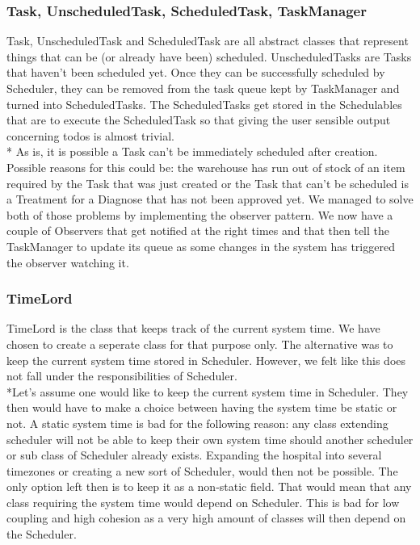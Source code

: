 \documentclass[11pt]{article}
\begin{document}
\subsubsection{Task, UnscheduledTask, ScheduledTask, TaskManager}
Task, UnscheduledTask and ScheduledTask are all abstract classes that represent things that can be (or already have been) scheduled. UnscheduledTasks are Tasks that haven't been scheduled yet. Once they can be successfully scheduled by Scheduler, they can be removed from the task queue kept by TaskManager and turned into ScheduledTasks. The ScheduledTasks get stored in the Schedulables that are to execute the ScheduledTask so that giving the user sensible output concerning todos is almost trivial.
\\* As is, it is possible a Task can't be immediately scheduled after creation. Possible reasons for this could be: the warehouse has run out of stock of an item required by the Task that was just created or the Task that can't be scheduled is a Treatment for a Diagnose that has not been approved yet. We managed to solve both of those problems by implementing the observer pattern. We now have a couple of Observers that get notified at the right times and that then tell the TaskManager to update its queue as some changes in the system has triggered the observer watching it.

\subsubsection{TimeLord}
TimeLord is the class that keeps track of the current system time. We have chosen to create a seperate class for that purpose only. The alternative was to keep the current system time stored in Scheduler. However, we felt like this does not fall under the responsibilities of Scheduler. 
\\*Let's assume one would like to keep the current system time in Scheduler. They then would have to make a choice between having the system time be static or not. A static system time is bad for the following reason: any class extending scheduler will not be able to keep their own system time should another scheduler or sub class of Scheduler already exists. Expanding the hospital into several timezones or creating a new sort of Scheduler, would then not be possible. The only option left then is to keep it as a non-static field. That would mean that any class requiring the system time would depend on Scheduler. This is bad for low coupling and high cohesion as a very high amount of classes will then depend on the Scheduler.
\end{document}
